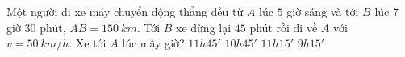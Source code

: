 \begin{vidu}%
Một người đi xe máy chuyển động thẳng đều từ $A$ lúc $5$ giờ sáng và tới $B$ lúc $7$ giờ $30$ phút, $AB = 150\ km$. Tới $B$ xe dừng lại $45$ phút rồi đi về $A$ với $v = 50\ km/h$. Xe tới $A$ lúc mấy giờ?
\choice
{$11h45'$}
{$10h45'$}
{\True $11h15'$}
{$9h15'$}
\end{vidu}
